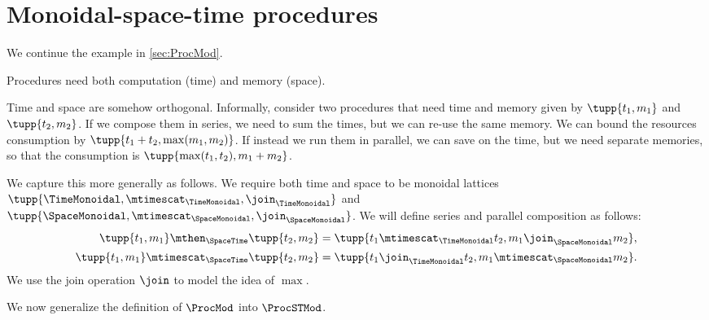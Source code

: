 
\section{Monoidal-space-time procedures}
\label{sub:monoidal-space-time}
We continue the example in \cref{sec:ProcMod}.

Procedures need both computation (time) and memory (space).

Time and space are somehow orthogonal.
%
Informally, consider two procedures that need time and memory given by $\tupp{t_1,m_1}$ and $\tupp{t_2, m_2}$. If we compose them in series, we need to sum the times, but we can re-use the same memory. We can bound the resources consumption  by $\tupp{t_1+t_2,\max(m_1, m_2)}$.
If instead we run them in parallel, we can save on the time, but we need separate memories, so that the consumption is $\tupp{\max(t_1,t_2), m_1 + m_2}$.

We capture this more generally as follows. We require both time and space to be monoidal lattices $\tupp{\TimeMonoidal, \mtimescat_{\TimeMonoidal}, \join_{\TimeMonoidal}}$ and
$\tupp{\SpaceMonoidal, \mtimescat_{\SpaceMonoidal}, \join_{\SpaceMonoidal}}$.
%
We will define series and parallel composition as follows:
\begin{equation}
    \begin{aligned}
        \tupp{t_1,m_1} \mthen_{\SpaceTime}  \tupp{t_2,m_2} &= \tupp{t_1 \mtimescat_{\TimeMonoidal} t_2, m_1 \join_{\SpaceMonoidal} m_2}, \\
        \tupp{t_1,m_1} \mtimescat_{\SpaceTime}  \tupp{t_2,m_2} &= \tupp{t_1 \join_{\TimeMonoidal} t_2, m_1 \mtimescat_{\SpaceMonoidal} m_2}.
    \end{aligned}
\end{equation}
We use the join operation $\join$ to model the idea of $\max$.

We now generalize the definition of $\ProcMod$ into $\ProcSTMod$.



